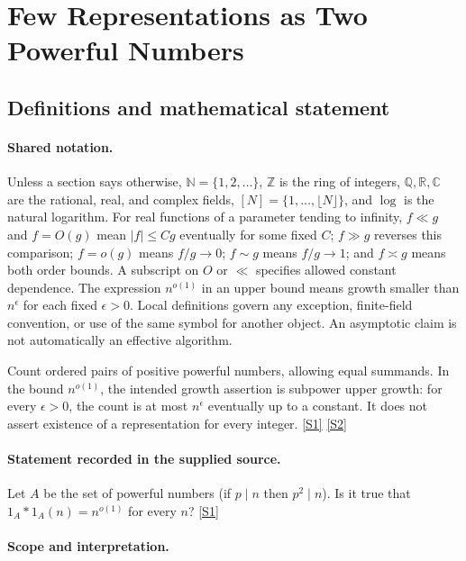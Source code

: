 \documentclass[11pt,a4paper]{article}
\newcommand{\N}{\mathbb{N}}
\newcommand{\Z}{\mathbb{Z}}
\newcommand{\Q}{\mathbb{Q}}
\newcommand{\R}{\mathbb{R}}
\newcommand{\C}{\mathbb{C}}
\newcommand{\sref}[2]{\hyperlink{source:#1:#2}{[S#2]}}
\begin{document}
\section{Few Representations as Two Powerful Numbers}\label{statement}


\subsection{Definitions and mathematical statement}

\paragraph{Shared notation.}Unless a section says otherwise, $\N=\{1,2,\ldots\}$,
$\Z$ is the ring of integers, $\Q,\R,\C$ are the rational, real, and complex
fields, $[N]=\{1,\ldots,\lfloor N\rfloor\}$, and $\log$ is the natural
logarithm. For real functions of a parameter tending to infinity,
$f\ll g$ and $f=O(g)$ mean $|f|\leq Cg$ eventually for some fixed $C$;
$f\gg g$ reverses this comparison; $f=o(g)$ means $f/g\to0$;
$f\sim g$ means $f/g\to1$; and $f\asymp g$ means both order bounds.
A subscript on $O$ or $\ll$ specifies allowed constant dependence.
The expression $n^{o(1)}$ in an upper bound means growth smaller than
$n^\epsilon$ for each fixed $\epsilon>0$. Local definitions govern any
exception, finite-field convention, or use of the same symbol for another
object. An asymptotic claim is not automatically an effective algorithm.



Count ordered pairs of positive powerful numbers, allowing equal summands. In the bound $n^{o(1)}$, the intended growth assertion is subpower upper growth: for every $\epsilon>0$, the count is at most $n^\epsilon$ eventually up to a constant. It does not assert existence of a representation for every integer. \sref{statement}{1} \sref{statement}{2}

\paragraph{Statement recorded in the supplied source.}
Let $A$ be the set of powerful numbers (if $p\mid n$ then $p^2\mid n$). Is it true that $ 1_A\ast 1_A(n)=n^{o(1)} $ for every $n$? \sref{statement}{1}

\paragraph{Scope and interpretation.}
\end{document}
